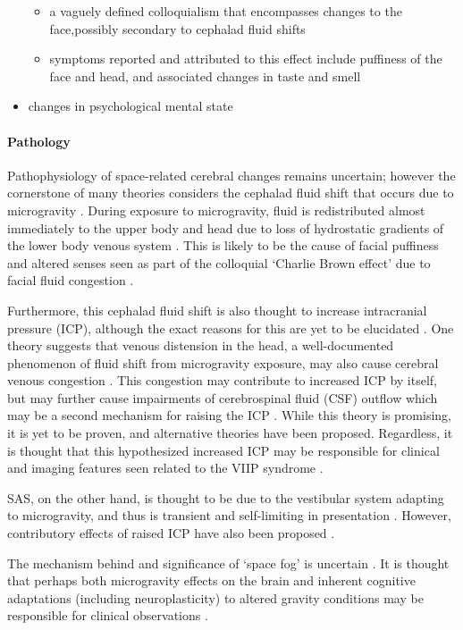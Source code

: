 \begin{itemize}
	\begin{itemize}
		\tightlist
		\item
		a vaguely defined colloquialism that encompasses changes to the face,possibly secondary to cephalad fluid shifts 
		\item
		symptoms reported and attributed to this effect include puffiness of the face and head, and associated changes in taste and smell 
	\end{itemize}
	\item
	changes in psychological mental state 
\end{itemize}

\paragraph{Pathology}

Pathophysiology of space-related cerebral changes remains uncertain; however the cornerstone of many theories considers the cephalad fluid shift that occurs due to microgravity . During exposure to microgravity, fluid is redistributed almost immediately to the upper body and head due to loss of hydrostatic gradients of the lower body venous system . This is likely to be the cause of facial puffiness and altered senses seen as part of the colloquial `Charlie Brown effect' due to facial fluid congestion .

Furthermore, this cephalad fluid shift is also thought to increase intracranial pressure (ICP), although the exact reasons for this are yet to be elucidated . One theory suggests that venous distension in the head, a well-documented phenomenon of fluid shift from microgravity exposure, may also cause cerebral venous congestion . This congestion may contribute to increased ICP by itself, but may further cause impairments of cerebrospinal fluid (CSF) outflow which may be a second mechanism for raising the ICP . While this theory is promising, it is yet to be proven, and alternative theories have been proposed. Regardless, it is thought that this hypothesized increased ICP may be responsible for clinical and imaging features seen related to the VIIP syndrome .

SAS, on the other hand, is thought to be due to the vestibular system adapting to microgravity, and thus is transient and self-limiting in presentation . However, contributory effects of raised ICP have also been proposed .

The mechanism behind and significance of `space fog' is uncertain . It is thought that perhaps both microgravity effects on the brain and inherent cognitive adaptations (including neuroplasticity) to altered gravity conditions may be responsible for clinical observations .

